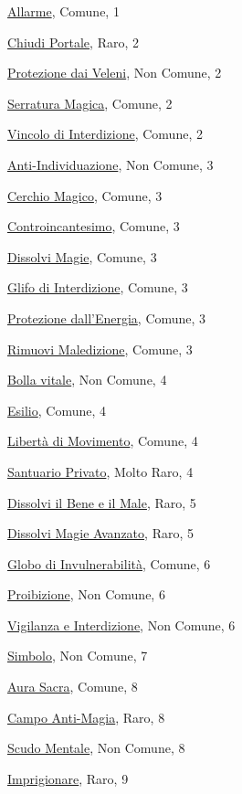 \begin{multicols}{3}
{{\hyperlink{Allarme}{Allarme}, Comune, 1

\hyperlink{Chiudi Portale}{Chiudi Portale}, Raro, 2

\hyperlink{Protezione dai Veleni}{Protezione dai Veleni}, Non Comune, 2

\hyperlink{Serratura Magica}{Serratura Magica}, Comune, 2

\hyperlink{Vincolo di Interdizione}{Vincolo di Interdizione}, Comune, 2

\hyperlink{Anti-Individuazione}{Anti-Individuazione}, Non Comune, 3

\hyperlink{Cerchio Magico}{Cerchio Magico}, Comune, 3

\hyperlink{Controincantesimo}{Controincantesimo}, Comune, 3

\hyperlink{Dissolvi Magie}{Dissolvi Magie}, Comune, 3

\hyperlink{Glifo di Interdizione}{Glifo di Interdizione}, Comune, 3

\hyperlink{Protezione dall'Energia}{Protezione dall'Energia}, Comune, 3

\hyperlink{Rimuovi Maledizione}{Rimuovi Maledizione}, Comune, 3

\hyperlink{Bolla vitale}{Bolla vitale}, Non Comune, 4

\hyperlink{Esilio}{Esilio}, Comune, 4

\hyperlink{Libertà di Movimento}{Libertà di Movimento}, Comune, 4

\hyperlink{Santuario Privato}{Santuario Privato}, Molto Raro, 4

\hyperlink{Dissolvi il Bene e il Male}{Dissolvi il Bene e il Male}, Raro, 5

\hyperlink{Dissolvi Magie Avanzato}{Dissolvi Magie Avanzato}, Raro, 5

\hyperlink{Globo di Invulnerabilità}{Globo di Invulnerabilità}, Comune, 6

\hyperlink{Proibizione}{Proibizione}, Non Comune, 6

\hyperlink{Vigilanza e Interdizione}{Vigilanza e Interdizione}, Non Comune, 6

\hyperlink{Simbolo}{Simbolo}, Non Comune, 7

\hyperlink{Aura Sacra}{Aura Sacra}, Comune, 8

\hyperlink{Campo Anti-Magia}{Campo Anti-Magia}, Raro, 8

\hyperlink{Scudo Mentale}{Scudo Mentale}, Non Comune, 8

\hyperlink{Imprigionare}{Imprigionare}, Raro, 9

}}
\end{multicols}
